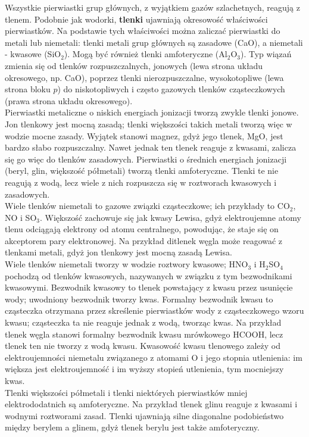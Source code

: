 \documentclass{article}
\begin{document}
Wszystkie pierwiastki grup głównych, z wyjątkiem gazów szlachetnych, reagują z tlenem. Podobnie jak wodorki, \textbf{tlenki} ujawniają okresowość właściwości pierwiastków. Na podstawie tych właściwości można zaliczać pierwiastki do metali lub niemetali: tlenki metali grup głównych są zasadowe (CaO), a niemetali - kwasowe (SiO$_2$). Mogą być również tlenki amfoteryczne (Al$_2$O$_3$). Typ wiązań zmienia się od tlenków rozpuszczalnych, jonowych (lewa strona układu okresowego, np. CaO), poprzez tlenki nierozpuszczalne, wysokotopliwe (lewa strona bloku $p$) do niskotopliwych i często gazowych tlenków cząsteczkowych (prawa strona układu okresowego). \\
Pierwiastki metaliczne o niskich energiach jonizacji tworzą zwykle tlenki jonowe. Jon tlenkowy jest mocną zasadą; tlenki większości takich metali tworzą więc w wodzie mocne zasady. Wyjątek stanowi magnez, gdyż jego tlenek, MgO, jest bardzo słabo rozpuszczalny. Nawet jednak ten tlenek reaguje z kwasami, zalicza się go więc do tlenków zasadowych. Pierwiastki o średnich energiach jonizacji (beryl, glin, większość półmetali) tworzą tlenki amfoteryczne. Tlenki te nie reagują z wodą, lecz wiele z nich rozpuszcza się w roztworach kwasowych i zasadowych. \\
Wiele tlenków niemetali to gazowe związki cząsteczkowe; ich przykłady to CO$_2$, NO i SO$_3$. Większość zachowuje się jak kwasy Lewisa, gdyż elektroujemne atomy tlenu odciągają elektrony od atomu centralnego, powodując, że staje się on akceptorem pary elektronowej. Na przykład ditlenek węgla może reagować z tlenkami metali, gdyż jon tlenkowy jest mocną zasadą Lewisa. \\
Wiele tlenków niemetali tworzy w wodzie roztwory kwasowe; HNO$_3$ i H$_2$SO$_4$ pochodzą od tlenków kwasowych, nazywanych w związku z tym bezwodnikami kwasowymi. Bezwodnik kwasowy to tlenek powstający z kwasu przez usunięcie wody; uwodniony bezwodnik tworzy kwas. Formalny bezwodnik kwasu to cząsteczka otrzymana przez skreślenie pierwiastków wody z cząsteczkowego wzoru kwasu; cząsteczka ta nie reaguje jednak z wodą, tworząc kwas. Na przykład tlenek węgla stanowi formalny bezwodnik kwasu mrówkowego HCOOH, lecz tlenek ten nie tworzy z wodą kwasu. Kwasowość kwasu tlenowego zależy od elektroujemności niemetalu związanego z atomami O i jego stopnia utlenienia: im większa jest elektroujemność i im wyższy stopień utlenienia, tym mocniejszy kwas. \\
Tlenki większości półmetali i tlenki niektórych pierwiastków mniej elektrododatnich są amfoteryczne. Na przykład tlenek glinu reaguje z kwasami i wodnymi roztworami zasad. Tlenki ujawniają silne diagonalne podobieństwo między berylem a glinem, gdyż tlenek berylu jest także amfoteryczny. 
\end{document}
